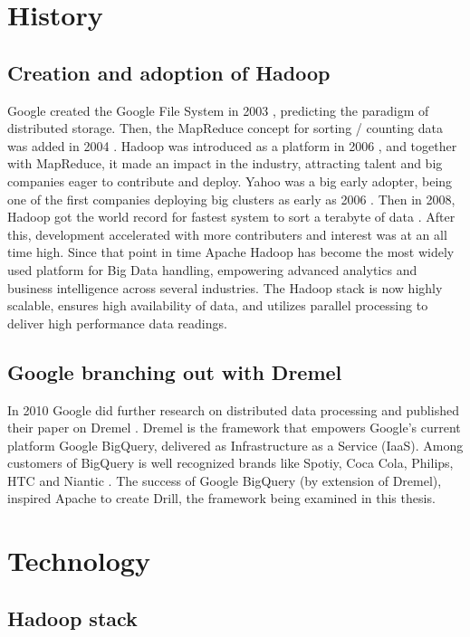 \documentclass[a4paper,english]{report}
\begin{document}
	\section{History}
		\subsection{Creation and adoption of Hadoop}
		Google created the Google File System in 2003 \cite{gfs}, predicting the paradigm of distributed storage. Then, the MapReduce concept for sorting / counting data was added in 2004 \cite{mapredoriginal}. Hadoop was introduced as a platform in 2006 \cite{hadoopguide}, and together with MapReduce, it made an impact in the industry, attracting talent and big companies eager to contribute and deploy. Yahoo was a big early adopter, being one of the first companies deploying big clusters as early as 2006 \cite{hadoopguide}. Then in 2008, Hadoop got the world record for fastest system to sort a terabyte of data \cite{hadoopguide}. After this, development accelerated with more contributers and interest was at an all time high. Since that point in time Apache Hadoop has become the most widely used platform for Big Data handling, empowering advanced analytics and business intelligence across several industries. The Hadoop stack is now highly scalable, ensures high availability of data, and utilizes parallel processing to deliver high performance data readings.
		
		\subsection{Google branching out with Dremel}
		In 2010 Google did further research on distributed data processing and published their paper on Dremel \cite{dremel}. Dremel is the framework that empowers Google's current platform Google BigQuery, delivered as Infrastructure as a Service (IaaS). Among customers of BigQuery is well recognized brands like Spotiy, Coca Cola, Philips, HTC and Niantic \cite{dremelcustomers}. The success of Google BigQuery (by extension of Dremel), inspired Apache to create Drill, the framework being examined in this thesis.
	
	\section{Technology}
	\label{technology}
		
		\subsection{Hadoop stack}
		
\end{document}
